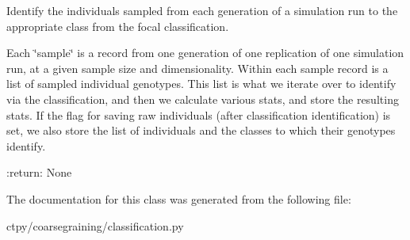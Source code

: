 Identify the individuals sampled from each generation of a simulation run to the appropriate class from the focal classification. 

Each \char`\"{}sample\char`\"{} is a record from one generation of one replication of one simulation run, at a given sample size and dimensionality. Within each sample record is a list of sampled individual genotypes. This list is what we iterate over to identify via the classification, and then we calculate various stats, and store the resulting stats. If the flag for saving raw individuals (after classification identification) is set, we also store the list of individuals and the classes to which their genotypes identify.

\-:return\-: None 

The documentation for this class was generated from the following file\-:\begin{DoxyCompactItemize}
\item 
ctpy/coarsegraining/classification.\-py\end{DoxyCompactItemize}
